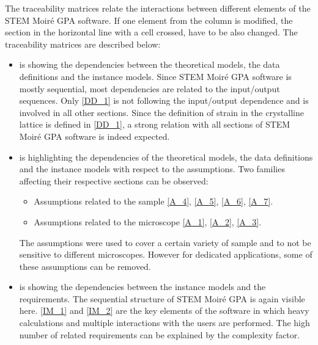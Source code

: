 \documentclass[12pt]{article}
\newcommand{\progname}{STEM Moir{\'e} GPA}
\begin{document}
The traceability matrices relate the interactions between different elements of 
the \progname{} software. If one element from the column is modified, the 
section in the horizontal line with a cell crossed, have to be also changed. The 
traceability matrices are described below:
\begin{itemize}
\item{} is showing the dependencies between the theoretical 
models, the data definitions and the instance models. Since \progname{} software 
is mostly sequential, most dependencies are related to the input/output 
sequences. Only \cref{DD_1} is not following the input/output dependence and is 
involved in all other sections. Since the definition of strain in the 
crystalline lattice is defined in \cref{DD_1}, a strong relation with all 
sections of \progname{} software is indeed expected.
\item {} is highlighting the dependencies of the theoretical 
models, the data definitions and the instance models with respect to the 
assumptions. Two families affecting their respective sections can be observed:
\begin{itemize}
\item Assumptions related to the sample \cref{A_4}, \cref{A_5}, \cref{A_6}, 
\cref{A_7}. 
\item Assumptions related to the microscope \cref{A_1}, \cref{A_2}, \cref{A_3}.
\end{itemize}
The assumptions were used to cover a certain variety of sample and to not be 
sensitive to different microscopes. However for dedicated applications, some of 
these assumptions can be removed.
\item {} is showing the dependencies between the instance models 
and the requirements. The sequential structure of \progname{} is again visible 
here. \cref{IM_1} and \cref{IM_2} are the key elements of the software in which 
heavy calculations and multiple interactions with the users are performed. The 
high number of related requirements can be explained by the complexity factor.
\end{itemize}
\end{document}
